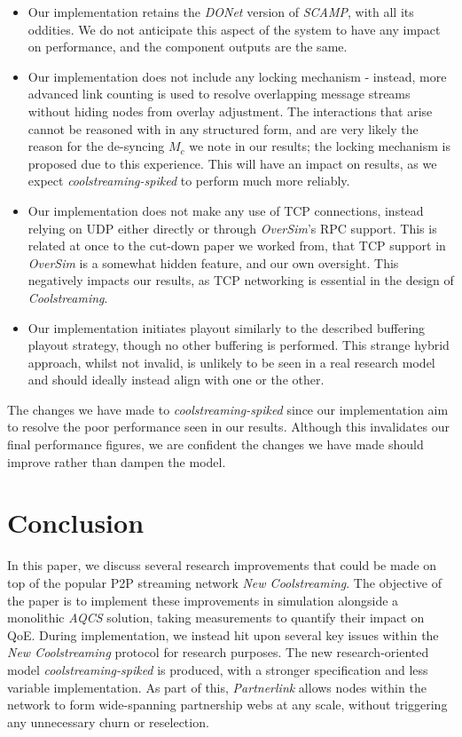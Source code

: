 \documentclass[12pt,a4paper]{article}
\begin{document}
\begin{itemize}
	\item Our implementation retains the \textit{DONet} version of \textit{SCAMP}, with all its oddities. We do not anticipate this aspect of the system to have any impact on performance, and the component outputs are the same.
	\item Our implementation does not include any locking mechanism - instead, more advanced link counting is used to resolve overlapping message streams without hiding nodes from overlay adjustment. The interactions that arise cannot be reasoned with in any structured form, and are very likely the reason for the de-syncing \(M_c\) we note in our results; the locking mechanism is proposed due to this experience. This will have an impact on results, as we expect \textit{coolstreaming-spiked} to perform much more reliably.
	\item Our implementation does not make any use of TCP connections, instead relying on UDP either directly or through \textit{OverSim}'s RPC support. This is related at once to the cut-down paper we worked from, that TCP support in \textit{OverSim} is a somewhat hidden feature, and our own oversight. This negatively impacts our results, as TCP networking is essential in the design of \textit{Coolstreaming}.
	\item Our implementation initiates playout similarly to the described buffering playout strategy, though no other buffering is performed. This strange hybrid approach, whilst not invalid, is unlikely to be seen in a real research model and should ideally instead align with one or the other.
\end{itemize}

The changes we have made to \textit{coolstreaming-spiked} since our implementation aim to resolve the poor performance seen in our results. Although this invalidates our final performance figures, we are confident the changes we have made should improve rather than dampen the model.
\
\section{Conclusion} \label{conclusion}
In this paper, we discuss several research improvements that could be made on top of the popular P2P streaming network \textit{New Coolstreaming}. The objective of the paper is to implement these improvements in simulation alongside a monolithic \textit{AQCS} solution, taking measurements to quantify their impact on QoE. During implementation, we instead hit upon several key issues within the \textit{New Coolstreaming} protocol for research purposes. The new research-oriented model \textit{coolstreaming-spiked} is produced, with a stronger specification and less variable implementation. As part of this, \textit{Partnerlink} allows nodes within the network to form wide-spanning partnership webs at any scale, without triggering any unnecessary churn or reselection.
\end{document}
